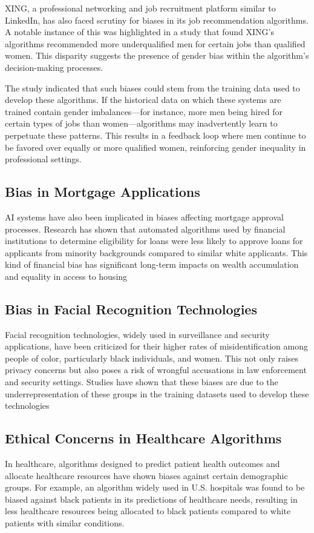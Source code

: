 XING, a professional networking and job recruitment platform similar to LinkedIn, has also faced scrutiny for biases in its job recommendation algorithms. A notable instance of this was highlighted in a study that found XING's algorithms recommended more underqualified men for certain jobs than qualified women. This disparity suggests the presence of gender bias within the algorithm's decision-making processes.

The study indicated that such biases could stem from the training data used to develop these algorithms. If the historical data on which these systems are trained contain gender imbalances—for instance, more men being hired for certain types of jobs than women—algorithms may inadvertently learn to perpetuate these patterns. This results in a feedback loop where men continue to be favored over equally or more qualified women, reinforcing gender inequality in professional settings.\cite{Lahoti_Gummadi_Weikum_2019}

\subsection{Bias in Mortgage Applications}
AI systems have also been implicated in biases affecting mortgage approval processes. Research has shown that automated algorithms used by financial institutions to determine eligibility for loans were less likely to approve loans for applicants from minority backgrounds compared to similar white applicants. This kind of financial bias has significant long-term impacts on wealth accumulation and equality in access to housing \cite{Bartlett_Morse_Stanton_Wallace_2022}

\subsection{Bias in Facial Recognition Technologies}
Facial recognition technologies, widely used in surveillance and security applications, have been criticized for their higher rates of misidentification among people of color, particularly black individuals, and women. This not only raises privacy concerns but also poses a risk of wrongful accusations in law enforcement and security settings. Studies have shown that these biases are due to the underrepresentation of these groups in the training datasets used to develop these technologies \cite{Buolamwini_Gebru_2018}

\subsection{Ethical Concerns in Healthcare Algorithms}
In healthcare, algorithms designed to predict patient health outcomes and allocate healthcare resources have shown biases against certain demographic groups. For example, an algorithm widely used in U.S. hospitals was found to be biased against black patients in its predictions of healthcare needs, resulting in less healthcare resources being allocated to black patients compared to white patients with similar conditions. \cite{Obermeyer_Powers_Vogeli_Mullainathan_2019}